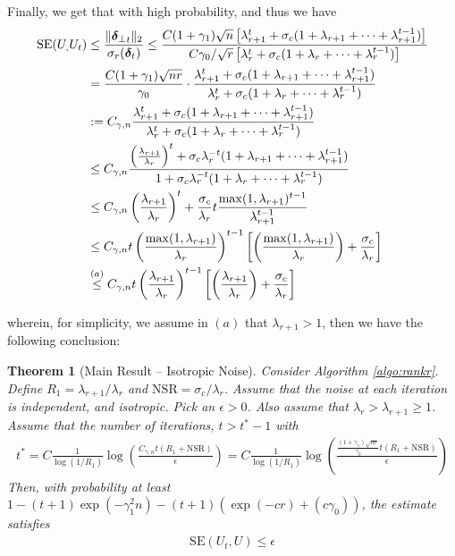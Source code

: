 \documentclass[10pt]{article}
\newtheorem{theorem}{Theorem}
\newcommand{\nsrmax}{\text{NSR}}
\newcommand{\SE}{\mathrm{SE}}
\begin{document}
Finally, we get that with high probability, 
and thus we have 
\begin{align*}
\SE(U_,U_t) &\leq \frac{\|\utsin_t\|_2}{\sigma_r(\utcos_t)} \leq \frac{C (1+ \gamma_1) \sqrt{n} \left[\lambda_{r+1}^t +  \sigma_c (1 + \lambda_{r+1} + \cdots +  \lambda_{r+1}^{t-1}) \right]}{C \gamma_0/\sqrt{r} \left[ \lambda_r^t + \sigma_c (1 + \lambda_r + \cdots + \lambda_r^{t-1})\right]} \\
&= \frac{C (1+ \gamma_1) \sqrt{nr}}{\gamma_0} \cdot \frac{\lambda_{r+1}^t +  \sigma_c (1 + \lambda_{r+1} + \cdots +  \lambda_{r+1}^{t-1})}{\lambda_r^t + \sigma_c (1 + \lambda_r + \cdots + \lambda_r^{t-1})} \\
&:= C_{\gamma,n} \frac{\lambda_{r+1}^t +  \sigma_c (1 + \lambda_{r+1} + \cdots +  \lambda_{r+1}^{t-1})}{\lambda_r^t + \sigma_c (1 + \lambda_r + \cdots + \lambda_r^{t-1})}\\
&\leq C_{\gamma,n} \frac{\left(\frac{\lambda_{r+1}}{\lambda_r}\right)^t +  \sigma_c \lambda_r^{-t} (1 + \lambda_{r+1} + \cdots +  \lambda_{r+1}^{t-1})}{1 + \sigma_c \lambda_r^{-t} (1 + \lambda_r + \cdots + \lambda_r^{t-1})} \\
&\leq C_{\gamma,n} \left(\frac{\lambda_{r+1}}{\lambda_r}\right)^t + \frac{\sigma_c}{\lambda_r} t \frac{\max(1, \lambda_{r+1})^{t-1}}{\lambda_{r+1}^{t-1}}\\
&\leq C_{\gamma,n} t \left( \frac{\max(1, \lambda_{r+1})}{\lambda_{r}}\right)^{t-1} \left[ \left(\frac{\max(1,\lambda_{r+1})}{\lambda_r}\right) + \frac{\sigma_c}{\lambda_r} \right] \\
&\overset{(a)}{\leq} C_{\gamma,n} t \left( \frac{\lambda_{r+1}}{\lambda_{r}}\right)^{t-1} \left[ \left(\frac{\lambda_{r+1}}{\lambda_r}\right) + \frac{\sigma_c}{\lambda_r} \right]
\end{align*}

wherein, for simplicity, we assume in $(a)$ that $\lambda_{r+1} > 1$, then we have the following conclusion:

\begin{theorem}[Main Result -- Isotropic Noise]
Consider Algorithm \ref{algo:rankr}.
Define $R_1 = \lambda_{r+1}/\lambda_r$ and $\nsrmax = \sigma_c/\lambda_r$. 
Assume that the noise at each iteration is independent, and isotropic. Pick an $\epsilon > 0$. Also assume that $\lambda_r > \lambda_{r+1} \geq 1$.  Assume that the number of iterations, $t > t^* - 1$ with
\begin{align*}
t^* = C \frac{1}{\log(1/R_1)} \log   \left( \frac{C_{\gamma,n} t (R_1 + \nsrmax)}{\epsilon}\right) = C \frac{1}{\log(1/R_1)} \log   \left( \frac{\frac{(1+ \gamma_1)\sqrt{nr}}{\gamma_0} t (R_1 + \nsrmax)}{\epsilon}\right)
\end{align*}
 Then, with probability at least $1 - (t + 1) \exp(- \gamma_1^2 n) - (t+1) (\exp(-cr) + (c\gamma_0))$, the estimate satisfies
 \begin{align*}
 \SE(U_t, U) \leq \epsilon
 \end{align*}
\end{theorem}
\end{document}

